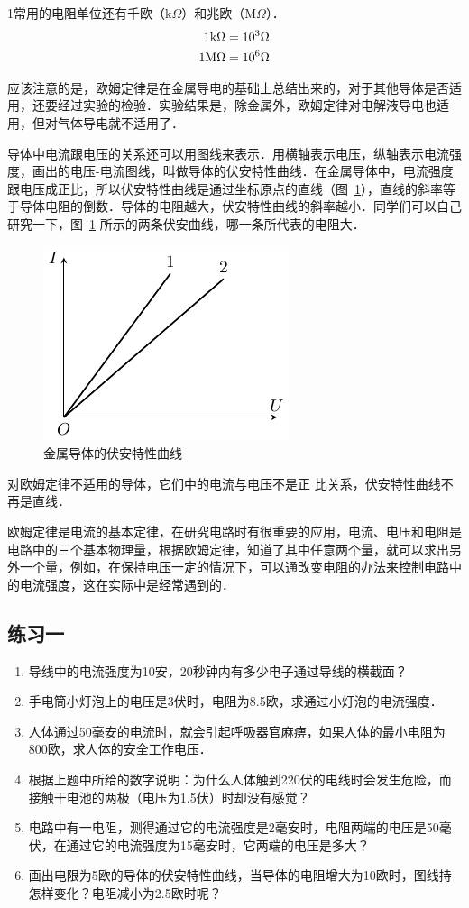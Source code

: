 1常用的电阻单位还有千欧（k$\Omega$）和兆欧（M$\Omega$）．
\[\begin{split}
    1{\rm k}\Omega&= 10^{3}\Omega\\
    1{\rm M}\Omega&=10^{6}\Omega
\end{split}\]

应该注意的是，欧姆定律是在金属导电的基础上总结出来的，对于其他导体是否适用，还要经过实验的检验．实验结果是，除金属外，欧姆定律对电解液导电也适用，但对气体导电就不适用了．

导体中电流跟电压的关系还可以用图线来表示．用横轴表示电压，纵轴表示电流强度，画出的电压-电流图线，叫做导体的伏安特性曲线．在金属导体中，电流强度跟电压成正比，所以伏安特性曲线是通过坐标原点的直线（图~\ref{fig_B_7-3}），直线的斜率等于导体电阻的倒数．导体的电阻越大，伏安特性曲线的斜率越小．同学们可以自己研究一下，图~\ref{fig_B_7-3} 所示的两条伏安曲线，哪一条所代表的电阻大．
\begin{figure}[htbp]
    \centering
    \includegraphics{fig/B/7-3.pdf}
    \caption{金属导体的伏安特性曲线}\label{fig_B_7-3}
\end{figure}


对欧姆定律不适用的导体，它们中的电流与电压不是正
比关系，伏安特性曲线不再是直线．

欧姆定律是电流的基本定律，在研究电路时有很重要的应用，电流、电压和电阻是电路中的三个基本物理量，根据欧姆定律，知道了其中任意两个量，就可以求出另外一个量，例如，在保持电压一定的情况下，可以通改变电阻的办法来控制电路中的电流强度，这在实际中是经常遇到的．


\subsection*{练习一}

\begin{enumerate}
    \item 导线中的电流强度为10安，20秒钟内有多少电子通过导线的横截面？
    \item 手电筒小灯泡上的电压是3伏时，电阻为8.5欧，求通过小灯泡的电流强度．
    \item 人体通过50毫安的电流时，就会引起呼吸器官麻痹，如果人体的最小电阻为800欧，求人体的安全工作电压．
    \item 根据上题中所给的数字说明：为什么人体触到220伏的电线时会发生危险，而接触干电池的两极（电压为1.5伏）时却没有感觉？
    \item 电路中有一电阻，测得通过它的电流强度是2毫安时，电阻两端的电压是50毫伏，在通过它的电流强度为15毫安时，它两端的电压是多大？
    \item 画出电限为5欧的导体的伏安特性曲线，当导体的电阻增大为10欧时，图线持怎样变化？电阻减小为2.5欧时呢？
\end{enumerate}


